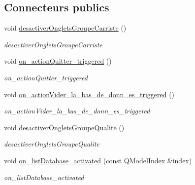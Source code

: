 \subsection*{Connecteurs publics}
\begin{DoxyCompactItemize}
\item 
\mbox{\label{class_main_window_a5b477f0785cfed5fdffcda39ad7b92cb}} 
void \mbox{\hyperlink{class_main_window_a5b477f0785cfed5fdffcda39ad7b92cb}{desactiver\+Onglets\+Groupe\+Carriste}} ()
\begin{DoxyCompactList}\small\item\em desactiver\+Onglets\+Groupe\+Carriste \end{DoxyCompactList}\item 
\mbox{\label{class_main_window_afe9d9d46e61e2460e636619577a9e8fd}} 
void \mbox{\hyperlink{class_main_window_afe9d9d46e61e2460e636619577a9e8fd}{on\+\_\+action\+Quitter\+\_\+triggered}} ()
\begin{DoxyCompactList}\small\item\em on\+\_\+action\+Quitter\+\_\+triggered \end{DoxyCompactList}\item 
\mbox{\label{class_main_window_af416c87932d9675ef70ea737ad4b1a86}} 
void \mbox{\hyperlink{class_main_window_af416c87932d9675ef70ea737ad4b1a86}{on\+\_\+action\+Vider\+\_\+la\+\_\+bas\+\_\+de\+\_\+donn\+\_\+es\+\_\+triggered}} ()
\begin{DoxyCompactList}\small\item\em on\+\_\+action\+Vider\+\_\+la\+\_\+bas\+\_\+de\+\_\+donn\+\_\+es\+\_\+triggered \end{DoxyCompactList}\item 
\mbox{\label{class_main_window_a720083a9a815c386b46003d02b4034da}} 
void \mbox{\hyperlink{class_main_window_a720083a9a815c386b46003d02b4034da}{desactiver\+Onglets\+Groupe\+Qualite}} ()
\begin{DoxyCompactList}\small\item\em desactiver\+Onglets\+Groupe\+Qualite \end{DoxyCompactList}\item 
void \mbox{\hyperlink{class_main_window_a37382033fa3cefb818a17d198707abe1}{on\+\_\+list\+Database\+\_\+activated}} (const Q\+Model\+Index \&index)
\begin{DoxyCompactList}\small\item\em on\+\_\+list\+Database\+\_\+activated \end{DoxyCompactList}\item 

\end{DoxyCompactItemize}
